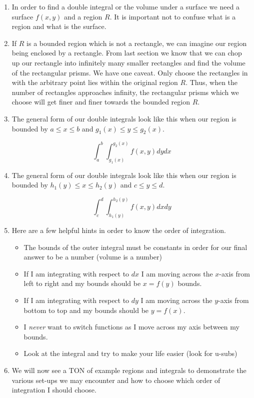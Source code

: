 \documentclass[11pt]{article}
\begin{document}
\begin{enumerate}
\item In order to find a double integral or the volume under a surface we need a surface $f(x,y)$ and a region $R$. It is important not to confuse what is a region and what is the surface.

\item If $R$ is a bounded region which is not a rectangle, we can imagine our region being enclosed by a rectangle. From last section we know that we can chop up our rectangle into infinitely many smaller rectangles and find the volume of the rectangular prisms. We have one caveat. Only choose the rectangles in with the arbitrary point lies within the original region $R$. Thus, when the number of rectangles approaches infinity, the rectangular prisms which we choose will get finer and finer towards the bounded region $R$.


\item The general form of our double integrals look like this when our region is bounded by $a \leq x \leq b$ and $g_1(x) \leq y \leq g_2(x)$.

\begin{equation*}
    \int_a^b \int_{g_1(x)}^{g_2(x)} f(x,y) dy dx
\end{equation*}

\item The general form of our double integrals look like this when our region is bounded by $h_1(y) \leq x \leq h_2(y)$ and $c \leq y \leq d$.

\begin{equation*}
    \int_c^d \int_{h_1(y)}^{h_2(y)} f(x,y) dx dy
\end{equation*}

\item Here are a few helpful hints in order to know the order of integration.

\begin{itemize}
    \item The bounds of the outer integral must be constants in order for our final answer to be a number (volume is a number)
    \item If I am integrating with respect to $dx$ I am moving across the $x$-axis from left to right and my bounds should be $x = f(y)$ bounds.
    \item If I am integrating with respect to $dy$ I am moving across the $y$-axis from bottom to top and my bounds should be $y = f(x)$.
    \item I \emph{never} want to switch functions as I move across my axis between my bounds.
    \item Look at the integral and try to make your life easier (look for u-subs)
\end{itemize}

\item We will now see a TON of example regions and integrals to demonstrate the various set-ups we may encounter and how to choose which order of integration I should choose. 

\end{enumerate}
\end{document}
